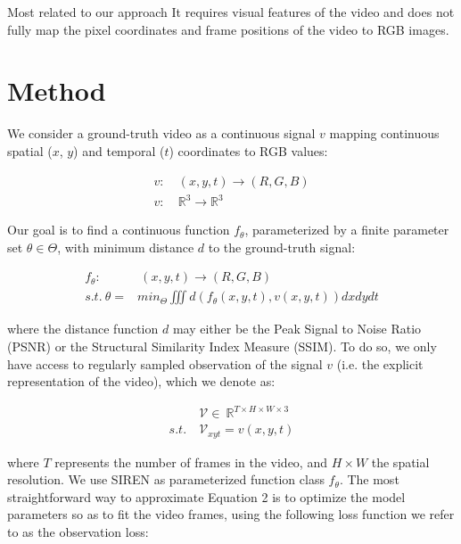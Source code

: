 \documentclass{article}
\begin{document}
Most related to our approach
It requires visual features of the video and does not fully map the pixel coordinates and frame positions of the video to RGB images.


\section{Method}
\label{sec_method}
We consider a ground-truth video as a continuous signal $v$ mapping continuous spatial ($x$, $y$) and temporal ($t$) coordinates to RGB values:

\begin{equation}
\begin{aligned}
v:& \: (x, y, t) \rightarrow (R, G, B) \\
v:& \: \mathbb{R}^3 \rightarrow \mathbb{R}^3
\end{aligned}
\end{equation}

Our goal is to find a continuous function $f_{\theta}$, parameterized by a finite parameter set $\theta \in \Theta$,
with minimum distance $d$ to the ground-truth signal:

\begin{equation}
\begin{aligned}
f_{\theta}:& \:(x, y, t) \rightarrow (R, G, B) \\
s.t. \: \theta =& min_{\Theta} \iiint d(f_{\theta}(x,y,t), v(x,y,t)) dx dy dt
\end{aligned}
\end{equation}

where the distance function $d$ may either be the Peak Signal to Noise Ratio (PSNR) or the Structural Similarity Index Measure (SSIM).
To do so, we only have access to regularly sampled observation of the signal $v$
(i.e. the explicit representation of the video), which we denote as:

\begin{equation}
\begin{aligned}
&\mathcal{V} \in  \: \mathbb{R}^{T \times H \times W \times 3} \\
s.t. \: &\mathcal{V}_{xyt} =   v(x, y, t) %
\end{aligned}
\end{equation}

where $T$ represents the number of frames in the video, and $H \times W$ the spatial resolution.
We use SIREN as parameterized function class $f_{\theta}$.
The most straightforward way to approximate Equation 2 is to optimize the model parameters so as to fit the video frames,
using the following loss function we refer to as the observation loss:
\end{document}
